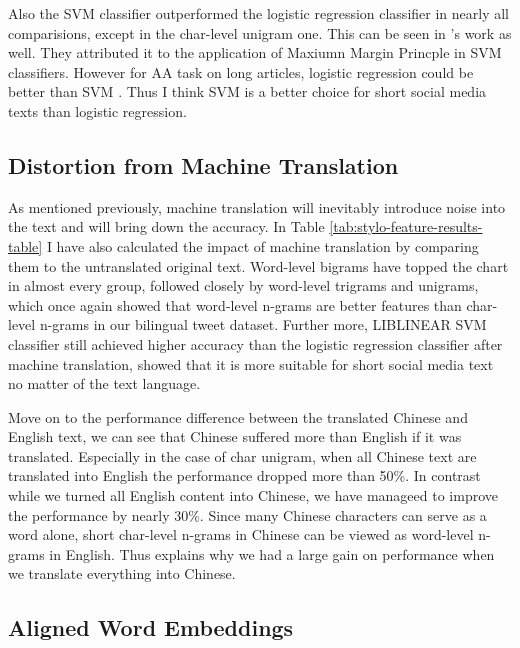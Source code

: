 \documentclass[11pt,a4paper]{article}
\begin{document}
Also the SVM classifier outperformed the logistic regression classifier in nearly all comparisions, except in the char-level unigram one. This can be seen in \citet{rocha2016authorship}'s work as well. They attributed it to the application of Maxiumn Margin Princple in SVM classifiers. However for AA task on long articles, logistic regression could be better than SVM \cite{bogdanova2014cross}. Thus I think SVM is a better choice for short social media texts than logistic regression.

\subsection{Distortion from Machine Translation}

As mentioned previously, machine translation will inevitably introduce noise into the text and will bring down the accuracy. In Table \ref{tab:stylo-feature-results-table} I have also calculated the impact of machine translation by comparing them to the untranslated original text. Word-level bigrams have topped the chart in almost every group, followed closely by word-level trigrams and unigrams, which once again showed that word-level n-grams are better features than char-level n-grams in our bilingual tweet dataset. Further more, LIBLINEAR SVM classifier still achieved higher accuracy than the logistic regression classifier after machine translation, showed that it is more suitable for short social media text no matter of the text language.

Move on to the performance difference between the translated Chinese and English text, we can see that Chinese suffered more than English if it was translated. Especially in the case of char unigram, when all Chinese text are translated into English the performance dropped more than 50\%. In contrast while we turned all English content into Chinese, we have manageed to improve the performance by nearly 30\%. Since many Chinese characters can serve as a word alone, short char-level n-grams in Chinese can be viewed as word-level n-grams in English. Thus explains why we had a large gain on performance when we translate everything into Chinese.

\subsection{Aligned Word Embeddings}
\end{document}

